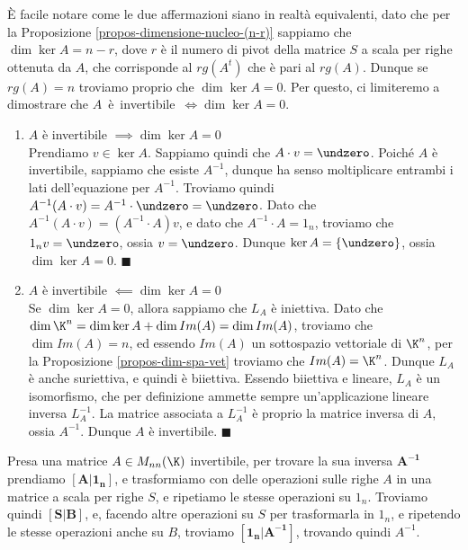 \documentclass[11pt, a4paper, titlepage, oneside]{scrbook}
\begin{document}
\Dimostrazione \nopagebreak

È facile notare come le due affermazioni siano in realtà equivalenti, dato che per la Proposizione \ref{propos-dimensione-nucleo-(n-r)} sappiamo che $\dim \ker A = n - r$, dove $r$ è il numero di pivot della matrice $S$ a scala per righe ottenuta da $A$, che corrisponde al $rg(A^t)$ che è pari al $rg(A)$. Dunque se $rg(A) = n$ troviamo proprio che $\dim \ker A = 0$. Per questo, ci limiteremo a dimostrare che \mbox{$A$ è invertibile $\iff \dim \ker A = 0$}. 
\begin{enumerate}[label=\arabic*°]
    \item $A$ è invertibile $\implies \dim \ker A = 0$ \\
    Prendiamo $v \in \ker A$. Sappiamo quindi che $A \cdot v = \undzero$. Poiché $A$ è invertibile, sappiamo che esiste $A^{-1}$, dunque ha senso moltiplicare entrambi i lati dell'equazione per $A^{-1}$. Troviamo quindi $A^{-1} (A \cdot v) = A^{-1} \cdot \undzero = \undzero$. Dato che $A^{-1} (A \cdot v) = (A^{-1} \cdot A) v$, e dato che $A^{-1} \cdot A = 1_n$, troviamo che $1_n v = \undzero$, ossia $v = \undzero$. Dunque $\ker A = \{\undzero\}$, ossia $\dim \ker A = 0$. $\blacksquare$
    \item $A$ è invertibile $\impliedby \dim \ker A = 0$ \\
    Se $\dim \ker A = 0$, allora sappiamo che $L_A$ è iniettiva. Dato che $\dim \K^n = \dim \ker A + \dim Im(A) = \dim Im(A)$, troviamo che $\dim Im(A) = n$, ed essendo $Im(A)$ un sottospazio vettoriale di $\K^n$, per la Proposizione \ref{propos-dim-spa-vet} troviamo che $Im(A) = \K^n$. Dunque $L_A$ è anche suriettiva, e quindi è biiettiva. Essendo biiettiva e lineare, $L_A$ è un isomorfismo, che per definizione ammette sempre un'applicazione lineare inversa $L_A^{-1}$. La matrice associata a $L_A^{-1}$ è proprio la matrice inversa di $A$, ossia $A^{-1}$. Dunque $A$ è invertibile. $\blacksquare$
\end{enumerate}

\begin{Proposizione}
\label{propos-trovare-inversa}
Presa una matrice $A \in M_{nn}(\K)$ invertibile, per trovare la sua inversa $\bm{A^{-1}}$ prendiamo $\bm{[A|1_n]}$, e trasformiamo con delle operazioni sulle righe $A$ in una matrice a scala per righe $S$, e ripetiamo le stesse operazioni su $1_n$. Troviamo quindi $\bm{[S|B]}$, e, facendo altre operazioni su $S$ per trasformarla in $1_n$, e ripetendo le stesse operazioni anche su $B$, troviamo $\bm{[1_n | A^{-1}]}$, trovando quindi $A^{-1}$.
\end{Proposizione}
\end{document}
